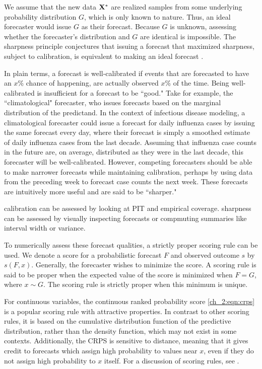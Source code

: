 We assume that the new data \( \mathbf{X}^* \) are realized samples from some underlying probability distribution \( G \), which is only known to nature.
Thus, an ideal forecaster would issue \( G \) as their forecast.
Because \( G \) is unknown, assessing whether the forecaster's distribution and \( G \) are identical is impossible.
The sharpness principle conjectures that issuing a forecast that maximized sharpness, subject to calibration, is equivalent to making an ideal forecast \citep{Gneiting2007Probabilistic}.

In plain terms, a forecast is well-calibrated if events that are forecasted to have an \( x \)\% chance of happening, are actually observed \( x \)\% of the time.
Being well-calibrated is insufficient for a forecast to be ``good."
Take for example, the ``climatological" forecaster, who issues forecasts based on the marginal distribution of the predictand.
In the context of infectious disease modeling, a climatological forecaster could issue a forecast for daily influenza cases by issuing the same forecast every day, where their forecast is simply a smoothed estimate of daily influenza cases from the last decade.
Assuming that influenza case counts in the future are, on average, distributed as they were in the last decade, this forecaster will be well-calibrated.
However, competing forecasters should be able to make narrower forecasts while maintaining calibration, perhaps by using data from the preceding week to forecast case counts the next week.
These forecasts are intuitively more useful and are said to be ``sharper."

calibration can be assessed by looking at PIT and empirical coverage.
sharpness can be assessed by visually inspecting forecasts or compmuting summaries like interval width or variance.

To numerically assess these forecast qualities, a strictly proper scoring rule can be used.
We denote a score for a probabilistic forecast \( F \) and observed outcome \( s \) by \( s(F, x) \).
Generally, the forecaster wishes to minimize the score.
A scoring rule is said to be proper when the expected value of the score is minimized when \( F = G \), where $x \sim G$.
The scoring rule is strictly proper when this minimum is unique.

For continuous variables, the continuous ranked probability score \eqref{ch_2:eqn:crps} is a popular scoring rule with attractive properties.
In contrast to other scoring rules, it is based on the cumulative distribution function of the predictive distribution, rather than the density function, which may not exist in some contexts.
Additionally, the CRPS is sensitive to distance, meaning that it gives credit to forecasts which assign high probability to values near \( x \), even if they do not assign high probability to \( x \) itself.
For a discussion of scoring rules, see \citet{gneiting2007strictly}.

